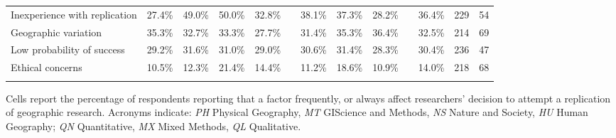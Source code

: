 \documentclass[]{interact}
\theoremstyle{plain}%
\theoremstyle{definition}
\theoremstyle{remark}
\begin{document}
\begin{landscape}
\begin{table}[h]
\begin{threeparttable}
\begin{tabular}{l c c c c c c c c c c c c}
         Inexperience with replication      & 27.4\% & 49.0\% & 50.0\% & 32.8\% & & 38.1\% & 37.3\% & 28.2\% & & 36.4\% & 229 & 54 \\
         Geographic variation               & 35.3\% & 32.7\% & 33.3\% & 27.7\% & & 31.4\% & 35.3\% & 36.4\% & & 32.5\% & 214 & 69 \\
         Low probability of success         & 29.2\% & 31.6\% & 31.0\% & 29.0\% & & 30.6\% & 31.4\% & 28.3\% & & 30.4\% & 236 & 47 \\
         Ethical concerns                   & 10.5\% & 12.3\% & 21.4\% & 14.4\% & & 11.2\% & 18.6\% & 10.9\% & & 14.0\% & 218 & 68 \\
                                            & & & & & & & & & & & & \\
        \hline
    \end{tabular}
    \begin{tablenotes}
        \footnotesize
        \item Cells report the percentage of respondents reporting that a factor frequently, or always affect researchers' decision to attempt a replication of geographic research. Acronyms indicate: \textit{PH} Physical Geography, \textit{MT} GIScience and Methods, \textit{NS} Nature and Society, \textit{HU} Human Geography; \textit{QN} Quantitative, \textit{MX} Mixed Methods, \textit{QL} Qualitative. 
    \end{tablenotes}
    \label{tab:motivations}
    \end{threeparttable}
\end{table}
\end{landscape}

\newpage
\end{document}
